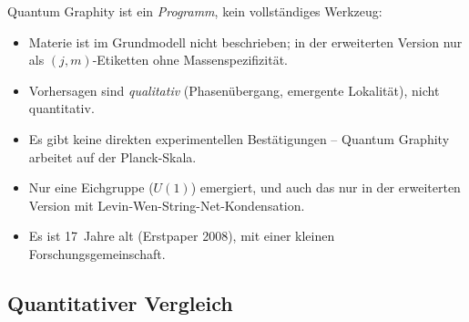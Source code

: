 Quantum Graphity ist ein \emph{Programm}, kein vollständiges Werkzeug:
\begin{itemize}[leftmargin=2em,itemsep=2pt,topsep=2pt]
  \item Materie ist im Grundmodell nicht beschrieben; in der
        erweiterten Version nur als $(j, m)$-Etiketten ohne
        Massenspezifizität.
  \item Vorhersagen sind \emph{qualitativ} (Phasenübergang,
        emergente Lokalität), nicht quantitativ.
  \item Es gibt keine direkten experimentellen Bestätigungen --
        Quantum Graphity arbeitet auf der Planck-Skala.
  \item Nur eine Eichgruppe ($U(1)$) emergiert, und auch das nur in
        der erweiterten Version mit Levin-Wen-String-Net-Kondensation.
  \item Es ist 17~Jahre alt (Erstpaper 2008), mit einer kleinen
        Forschungsgemeinschaft.
\end{itemize}

\subsection{Quantitativer Vergleich}

\begin{center}
\renewcommand{\arraystretch}{1.4}
{\small
{}
}
\renewcommand{\arraystretch}{1.0}
\end{center}

